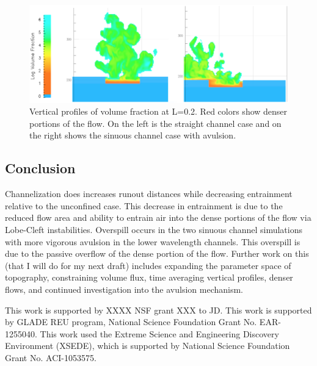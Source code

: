 \begin{figure}[ht]
 \centering
 \includegraphics[width= \linewidth]{overspill.eps}
 \caption{ Vertical profiles of volume fraction at L=0.2. Red colors show denser portions of the flow. On the left is the straight channel case and on the right shows the sinuous channel case with avulsion. }
 \label{fig:ove} 
\end{figure}


\subsection{Conclusion}
Channelization does increases runout distances while decreasing entrainment relative to the unconfined case. This decrease in entrainment is due to the reduced flow area and ability to entrain air into the dense portions of the flow via Lobe-Cleft instabilities. Overspill occurs in the two sinuous channel simulations with more vigorous avulsion in the lower wavelength channels. This overspill is due to the passive overflow of the dense portion of the flow. 
Further work on this (that I will do for my next draft) includes expanding the parameter space of topography, constraining volume flux, time averaging vertical profiles, denser flows, and continued investigation into the avulsion mechanism. 


%

\acknowledgments
This work is supported by XXXX NSF grant XXX to JD. 
This work is supported by GLADE REU program, National Science Foundation Grant No. EAR-1255040. 
This work used the Extreme Science and Engineering Discovery Environment (XSEDE), which is supported by National Science Foundation Grant No. ACI-1053575.


%
%
%
%
%
%
%
%
%
\nocite{*}


